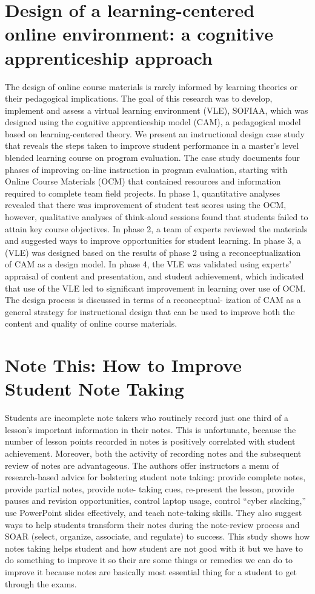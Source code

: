 \documentclass[12pt]{article}
\begin{document}
\section{Design of a learning-centered online environment: a cognitive apprenticeship approach}
The design of online course materials is rarely informed by learning theories or their pedagogical implications. The goal of this research was to develop, implement and assess a virtual learning environment (VLE), SOFIAA, which was designed using the cognitive apprenticeship model (CAM), a pedagogical model based on learning-centered theory. We present an instructional design case study that reveals the steps taken to improve student performance in a master’s level blended learning course on program evaluation. The case study documents four phases of improving on-line instruction in program evaluation, starting with Online Course Materials (OCM) that contained resources and information required to complete team field projects. In phase 1, quantitative analyses revealed that there was improvement of student test scores using the OCM, however, qualitative analyses of think-aloud sessions found that students failed to attain key course objectives. In phase 2, a team of experts reviewed the materials and suggested ways to improve opportunities for student learning. In phase 3, a (VLE) was designed based on the results of phase 2 using a reconceptualization of CAM as a design model. In phase 4, the VLE was validated using experts’ appraisal of content and presentation, and student achievement, which indicated that use of the VLE led to significant improvement in learning over use of OCM. The design process is discussed in terms of a reconceptual- ization of CAM as a general strategy for instructional design that can be used to improve both the content and quality of online course materials.

\section{Note This: How to Improve Student Note Taking}
Students are incomplete note takers who routinely record just one third of a lesson’s important information in their notes. This is unfortunate, because the number of lesson points recorded in notes is positively correlated with student achievement. Moreover, both the activity of recording notes and the subsequent review of notes are advantageous. The authors offer instructors a menu of research-based advice for bolstering student note taking: provide complete notes, provide partial notes, provide note- taking cues, re-present the lesson, provide pauses and revision opportunities, control laptop usage, control “cyber slacking,” use PowerPoint slides effectively, and teach note-taking skills. They also suggest ways to help students transform their notes during the note-review process and SOAR (select, organize, associate, and regulate) to success.
This study shows how notes taking helps student and how student are not good with it but we have to do something to improve it so their are some things or remedies we can do to improve it because notes are basically most essential thing for a student to get through the exams.
\end{document}

